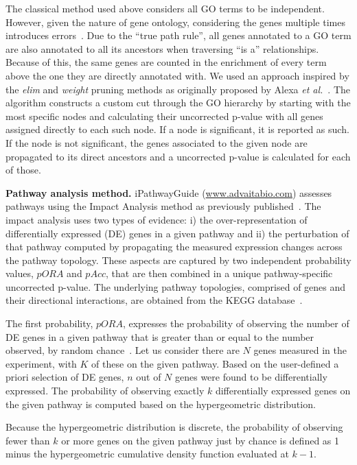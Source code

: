 The classical method used above considers all GO terms to be independent. However, given the nature of gene ontology, considering the genes multiple times introduces errors~\cite{Rhee:2008, DraghiciBook:2011}. Due to the ``true path rule'', all  genes annotated to a GO term are also annotated to all its ancestors when traversing ``is a'' relationships. Because of this, the same genes are counted in the enrichment of every term above the one they are directly annotated with.  We used an approach inspired by  the \textit{elim} and \emph{weight} pruning methods as originally proposed by Alexa \textit{et al.}~\cite{Alexa:2006}. The algorithm constructs a custom cut through the GO hierarchy by starting with the most specific nodes and calculating their uncorrected p-value with all genes assigned directly to each such node. If a node is significant, it is reported as such. If the node is not significant, the genes associated to the given node are propagated to its direct ancestors and a uncorrected p-value is calculated for each of those. 

\textbf{Pathway analysis method.}  
iPathwayGuide (\url{www.advaitabio.com}) assesses pathways using the Impact Analysis method as previously published~\cite{DraghiciPE:2007, tarca2009novel, khatri2007}. The impact analysis uses two types of evidence: i) the over-representation of differentially expressed (DE) genes in a given pathway and ii) the perturbation of that pathway computed by propagating the measured expression changes across the pathway topology. These aspects are captured by two independent probability values, $pORA$ and $pAcc$, that are then combined in a unique pathway-specific uncorrected p-value. The underlying pathway topologies, comprised of genes and their directional interactions, are obtained from the KEGG database~\cite{ogata1999kegg, kanehisa2010kegg, kanehisa2012kegg,  kanehisa2014data}.

The first probability, $pORA$, expresses the probability of observing the number of DE genes in a given pathway that is greater than or equal to the number observed, by random chance~\cite{DraghiciOE2:2003,DraghiciBook:2011}. Let us consider there are $N$ genes measured in the experiment, with $K$ of these on the given pathway. Based on the user-defined a priori selection of DE genes, $n$ out of $N$ genes were found to be differentially expressed. The probability of observing exactly $k$ differentially expressed genes on the given pathway is computed based on the hypergeometric distribution.

Because the hypergeometric distribution is discrete, the probability of observing fewer than $k$ or more genes on the given pathway just by chance is defined as 1 minus  the hypergeometric cumulative density function evaluated at $k-1$.


